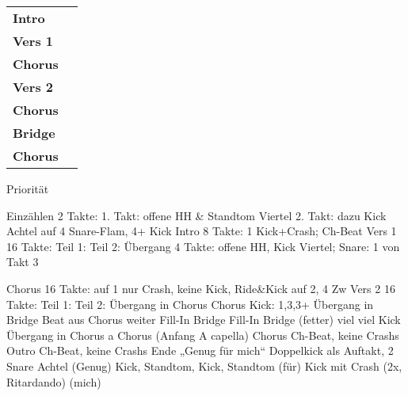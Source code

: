 
\begin{tabular}{p{1.6cm}l}
	\textbf{Intro}  & \\
	\textbf{Vers 1} & \\
	\textbf{Chorus} & \\
	\textbf{Vers 2} & \\
	\textbf{Chorus} & \\
	\textbf{Bridge} & \\
	\textbf{Chorus} & \\
\end{tabular}

Priorität

Einzählen   2 Takte: 1. Takt: offene HH & Standtom Viertel
                     2. Takt: dazu Kick Achtel
                              auf 4 Snare-Flam, 4+ Kick
Intro       8 Takte: 1 Kick+Crash; Ch-Beat
Vers 1     16 Takte: Teil 1:
                     Teil 2:
Übergang    4 Takte: offene HH, Kick Viertel; Snare: 1 von Takt 3

Chorus     16 Takte: auf 1 nur Crash, keine Kick,
                     Ride&Kick auf 2, 4
Zw
Vers 2     16 Takte: Teil 1:
                     Teil 2:
Übergang in Chorus
Chorus               Kick: 1,3,3+
Übergang in Bridge   Beat aus Chorus weiter
Fill-In              
Bridge               
Fill-In              
Bridge (fetter)      viel viel Kick
Übergang in Chorus   a
Chorus               (Anfang A capella)
Chorus               Ch-Beat, keine Crashs
Outro                Ch-Beat, keine Crashs
Ende                 „Genug für mich“
                Doppelkick als Auftakt, 2 Snare Achtel (Genug)
                Kick, Standtom, Kick, Standtom         (für)
                Kick mit Crash (2x, Ritardando)        (mich)
